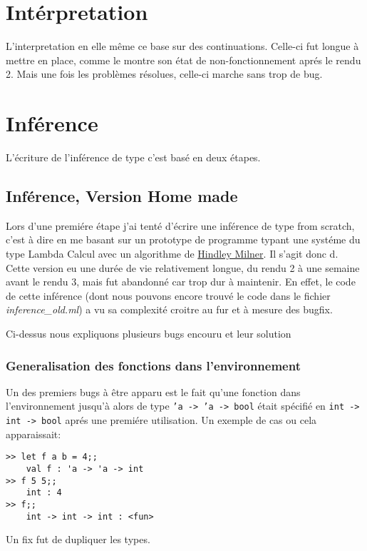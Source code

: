 \documentclass[paper=a4, fontsize=11pt, twocolumn]{article}
\begin{document}
\section{Intérpretation}
L'interpretation en elle même ce base sur des continuations. Celle-ci fut longue à mettre en place, comme le montre son état de non-fonctionnement aprés le rendu 2. Mais une fois les problèmes résolues, celle-ci marche sans trop de bug.

\section{Inférence}
L'écriture de l'inférence de type c'est basé en deux étapes.
\subsection{Inférence, Version Home made}
Lors d'une premiére étape j'ai tenté d'écrire une inférence de type from scratch, c'est à dire en me basant sur un prototype de programme typant une systéme du type Lambda Calcul avec un algorithme de \href{https://en.wikipedia.org/wiki/Hindley\%E2\%80\%93Milner_type_system}{Hindley Milner}. Il s'agit donc d. Cette version eu une durée de vie relativement longue, du rendu 2 à une semaine avant le rendu 3, mais fut abandonné car trop dur à maintenir. En effet, le code de cette inférence (dont nous pouvons encore trouvé le code dans le fichier \textit{inference\_old.ml})  a vu sa complexité croitre au fur et à mesure des bugfix.

Ci-dessus nous expliquons plusieurs bugs encouru et leur solution
\subsubsection{Generalisation des fonctions dans l'environnement}
Un des premiers bugs à être apparu est le fait qu'une fonction dans l'environnement jusqu'à alors de type \texttt{'a -> 'a -> bool} était spécifié en \texttt{int -> int -> bool} aprés une premiére utilisation.
Un exemple de cas ou cela apparaissait:
\begin{verbatim}
>> let f a b = 4;;
	val f : 'a -> 'a -> int
>> f 5 5;;
	int : 4
>> f;;
	int -> int -> int : <fun>
\end{verbatim}
Un fix fut de dupliquer les types.
\end{document}
